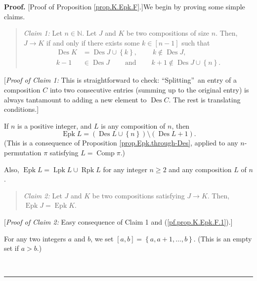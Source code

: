 \documentclass[numbers=enddot,12pt,final,onecolumn,notitlepage]{scrartcl}%
\theoremstyle{definition}
\newenvironment{statement}{\begin{quote}}{\end{quote}}
\newenvironment{proof}[1][Proof]{\noindent\textbf{#1.} }{\ \rule{0.5em}{0.5em}}
\newenvironment{noncompile}{}{}
\begin{document}
\begin{proof}
[Proof of Proposition \ref{prop.K.Epk.F}.]We begin by proving some simple claims.

\begin{statement}
\textit{Claim 1:} Let $n\in\mathbb{N}$. Let $J$ and $K$ be two compositions of
size $n$. Then, $J\rightarrow K$ if and only if there exists some $k\in\left[
n-1\right]  $ such that
\begin{align*}
\operatorname*{Des}K  &  =\operatorname*{Des}J\cup\left\{  k\right\}
,\ \ \ \ \ \ \ \ \ \ k\notin\operatorname*{Des}J,\\
k-1  &  \in\operatorname*{Des}J\ \ \ \ \ \ \ \ \ \ \text{and}%
\ \ \ \ \ \ \ \ \ \ k+1\notin\operatorname*{Des}J\cup\left\{  n\right\}  .
\end{align*}

\end{statement}

[\textit{Proof of Claim 1:} This is straightforward to check:
\textquotedblleft Splitting\textquotedblright\ an entry of a composition $C$
into two consecutive entries (summing up to the original entry) is always
tantamount to adding a new element to $\operatorname*{Des}C$. The rest is
translating conditions.]

If $n$ is a positive integer, and $L$ is any composition of $n$, then
\begin{equation}
\operatorname*{Epk}L=\left(  \operatorname*{Des}L\cup\left\{  n\right\}
\right)  \setminus\left(  \operatorname*{Des}L+1\right)  .
\label{pf.prop.K.Epk.F.1}%
\end{equation}
(This is a consequence of Proposition \ref{prop.Epk.through-Des}, applied to
any $n$-permutation $\pi$ satisfying $L=\operatorname*{Comp}\pi$.)

\begin{noncompile}
Also, $\operatorname*{Epk}L=\operatorname*{Lpk}L\cup\operatorname*{Rpk}L$ for
any integer $n\geq2$ and any composition $L$ of $n$.
\end{noncompile}

\begin{statement}
\textit{Claim 2:} Let $J$ and $K$ be two compositions satisfying $J\rightarrow
K$. Then, $\operatorname*{Epk}J=\operatorname*{Epk}K$.
\end{statement}

[\textit{Proof of Claim 2:} Easy consequence of Claim 1 and
(\ref{pf.prop.K.Epk.F.1}).]

For any two integers $a$ and $b$, we set $\left[  a,b\right]  =\left\{
a,a+1,\ldots,b\right\}  $. (This is an empty set if $a>b$.)


\end{proof}
\end{document}
